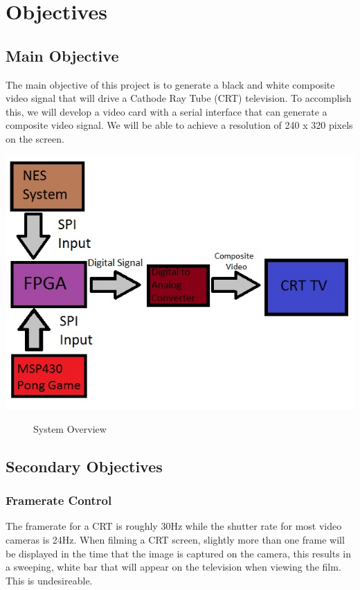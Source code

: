 \section{Objectives}

\subsection{Main Objective}

The main objective of this project is to generate a black and white composite
video signal that will drive a Cathode Ray Tube (CRT) television. To accomplish
this, we will develop a video card with a serial interface that can generate a
composite video signal. We will be able to achieve a resolution of 240 x 320
pixels on the screen.

\includegraphics{Diagram}
\begin{figure}[H]
   \centering
   \caption{System Overview}
\end{figure}

\subsection{Secondary Objectives}

\subsubsection{Framerate Control}

The framerate for a CRT is roughly 30Hz while the shutter rate for most video
cameras is 24Hz. When filming a CRT screen, slightly more than one frame will be
displayed in the time that the image is captured on the camera, this results in
a sweeping, white bar that will appear on the television when viewing the film.
This is undesireable.


